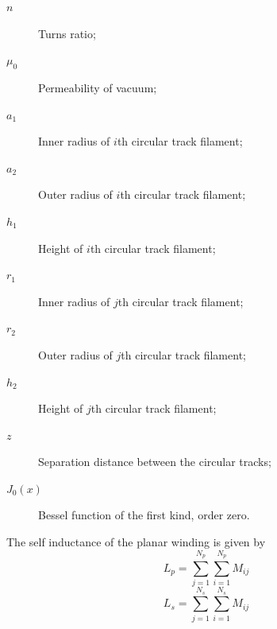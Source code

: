 \documentclass[conference]{IEEEtran}
\begin{document}
\begin{description}
\item[\hspace{-10pt}$ n $]        \hspace{-15pt} Turns ratio;
\item[\hspace{-10pt}$ \mu_{0} $]  \hspace{-15pt} Permeability of vacuum;
\item[\hspace{-10pt}$ a_{1} $]    \hspace{-15pt} Inner radius of $i$th circular track filament;
\item[\hspace{-10pt}$ a_{2} $]    \hspace{-15pt} Outer radius of $i$th circular track filament;
\item[\hspace{-10pt}$ h_{1} $]    \hspace{-15pt} Height of $i$th circular track filament;
\item[\hspace{-10pt}$ r_{1} $]    \hspace{-15pt} Inner radius of $j$th circular track filament;
\item[\hspace{-10pt}$ r_{2} $]    \hspace{-15pt} Outer radius of $j$th circular track filament;
\item[\hspace{-10pt}$ h_{2} $]    \hspace{-15pt} Height of $j$th circular track filament;
\item[\hspace{-10pt}$ z $]        \hspace{-15pt} Separation distance between the circular tracks;
\item[\hspace{-10pt}$ J_{0}(x) $] \hspace{-15pt} Bessel function of the first kind, order zero.
\end{description}

\hspace{-20pt} The self inductance of the planar winding is given by
\begin{equation}
	L_{p} = \sum\limits_{j=1}^{N_{p}}{\sum\limits_{i=1}^{N_{p}}{M_{ij}}}
\end{equation}
%
\begin{equation}
	L_{s} = \sum\limits_{j=1}^{N_{s}}{\sum\limits_{i=1}^{N_{s}}{M_{ij}}}
\end{equation}
\end{document}
